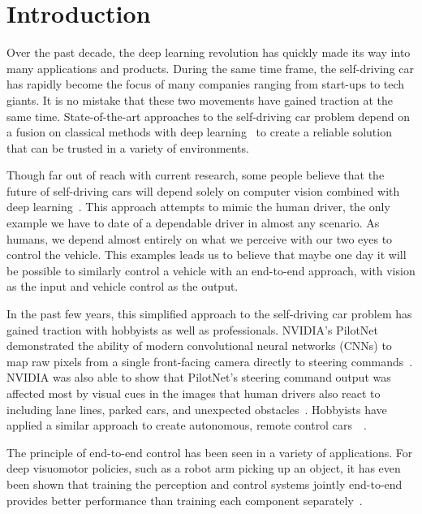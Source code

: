 \section{Introduction}
\label{sec:intro}


Over the past decade, the deep learning revolution has quickly made its way into
many applications and products. During the same time frame, the self-driving car
has rapidly become the focus of many companies ranging from start-ups to tech
giants. It is no mistake that these two movements have gained traction at the
same time. State-of-the-art approaches to the self-driving car problem depend on
a fusion on classical methods with deep
learning~\cite{ramos2017detecting} to create a
reliable solution that can be trusted in a variety of environments.

Though far out of reach with current research, some people believe that the
future of self-driving cars will depend solely on computer vision combined with deep
learning~\cite{huval2015empirical}. This approach attempts to mimic the human
driver, the only example we have to date of a dependable driver in almost any
scenario. As humans, we depend almost entirely on what we perceive with our two
eyes to control the vehicle. This examples leads us to believe that maybe one
day it will be possible to similarly control a vehicle with an end-to-end
approach, with vision as the input and vehicle control as the output.

In the past few years, this simplified approach to the self-driving car problem
has gained traction with hobbyists as well as professionals. NVIDIA's PilotNet
demonstrated the ability of modern convolutional neural networks (CNNs) to map
raw pixels from a single front-facing camera directly to steering
commands~\cite{bojarski2016end}. NVIDIA was also able to show that PilotNet's steering
command output was affected most by visual cues in the images that human drivers
also react to including lane lines, parked cars, and unexpected
obstacles~\cite{bojarski2017explaining}. Hobbyists have applied a similar
approach to create autonomous, remote control
cars~\cite{bechtel2018deeppicar}~\cite{donkeycar}.

The principle of end-to-end control has been seen in a variety of applications.
For deep visuomotor policies, such as a robot arm picking up an object, it has
even been shown that training the perception and control systems jointly
end-to-end provides better performance than training each component
separately~\cite{levine2016end}.

